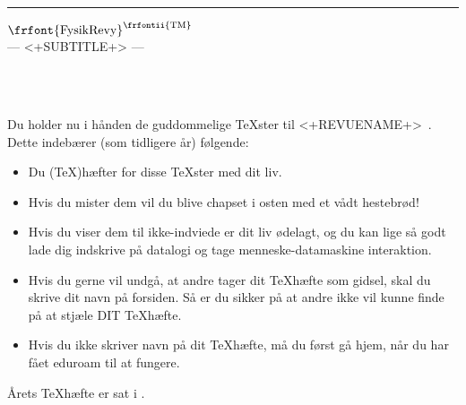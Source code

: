 \documentclass[11pt]{article}
\begin{document}
\thispagestyle{empty}

\begin{flushright}
	{\tiny <+TOPQUOTE+>}
\end{flushright}
\hrule
\begin{center}
{\frfont $\textrm{\frfont{FysikRevy}}^{\textrm{\frfontii{{TM}}}}$}
\\ {\frfontii --- <+SUBTITLE+> ---}
\vspace{2cm}

{}\\ %
\vspace{5mm}
{\cmfnttt{\today}}\\
\vspace{1cm}
%
\end{center}


\begin{center}

\Large
Du holder nu i hånden de guddommelige \TeX ster til <+REVUENAME+>\ <+REVUEYEAR+>. Dette indebærer (som tidligere år) følgende:
\begin{itemize}
\item Du (\TeX)hæfter for disse \TeX ster med dit liv.
\item Hvis du mister dem vil du blive chapset i osten med et vådt hestebrød!
\item Hvis du viser dem til ikke-indviede er dit liv ødelagt, og du kan lige så 
godt lade dig indskrive på datalogi og tage menneske-datamaskine interaktion.
\item Hvis du gerne vil undgå, at andre tager dit \TeX hæfte som gidsel,
skal du skrive dit navn på forsiden. Så er du sikker på at andre ikke vil kunne
finde på at stjæle DIT \TeX hæfte. 
\item Hvis du ikke skriver navn på dit \TeX hæfte, må du først gå hjem, når du har fået eduroam til at fungere.
\end{itemize}
\end{center}
\vfill



\vfill
Årets \TeX hæfte er sat i \LaTeXe.
\begin{center}
	{\tiny <+BOTTOMQUOTE+>}
\end{center}
\end{document}
